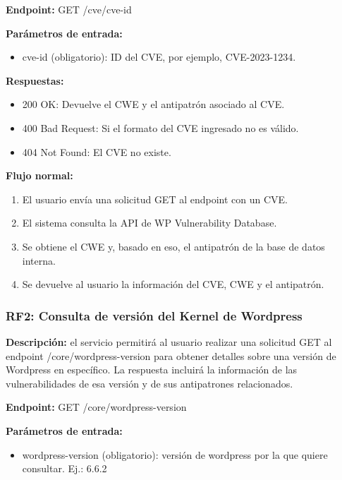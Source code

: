 \textbf{Endpoint:} GET /cve/{cve-id}

\textbf{Parámetros de entrada:} 
\begin{itemize}
    \item cve-id (obligatorio): ID del CVE, por ejemplo, CVE-2023-1234.
\end{itemize}

\textbf{Respuestas:}

\begin{itemize}
    \item 200 OK: Devuelve el CWE y el antipatrón asociado al CVE.
    \item 400 Bad Request: Si el formato del CVE ingresado no es válido.
    \item 404 Not Found: El CVE no existe.
\end{itemize}


\textbf{Flujo normal:}

\begin{enumerate}
    \item El usuario envía una solicitud GET al endpoint con un CVE.
    \item El sistema consulta la API de WP Vulnerability Database.
    \item Se obtiene el CWE y, basado en eso, el antipatrón de la base de datos interna.
    \item Se devuelve al usuario la información del CVE, CWE y el antipatrón.
\end{enumerate}

\subsubsection{RF2: Consulta de versión del Kernel de Wordpress}

\textbf{Descripción:} el servicio permitirá al usuario realizar una solicitud GET al endpoint /core/{wordpress-version} para obtener detalles sobre una versión de Wordpress en específico. La respuesta incluirá la información de las vulnerabilidades de esa versión y de sus antipatrones relacionados.

\textbf{Endpoint:} GET /core/{wordpress-version}

\textbf{Parámetros de entrada:}

\begin{itemize}
    \item wordpress-version (obligatorio): versión de wordpress por la que quiere consultar. Ej.: 6.6.2
\end{itemize}

